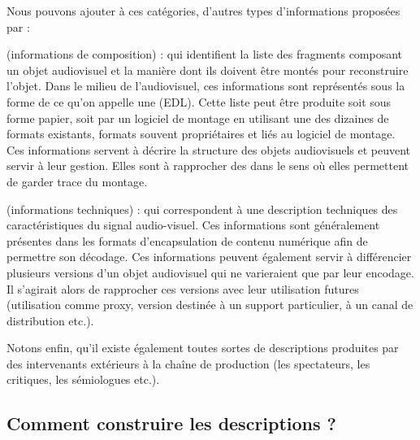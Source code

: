 Nous pouvons ajouter à ces catégories, d'autres types d'informations proposées par \cite{Rayers2002} : 
\begin{liste} 
	\item {} (informations de composition) : qui identifient la liste des fragments composant un objet audiovisuel et la manière dont ils doivent être montés pour reconstruire l'objet. 
	Dans le milieu de l'audiovisuel, ces informations sont représentés sous la forme de ce qu'on appelle une  (EDL).
	Cette liste peut être produite soit sous forme papier, soit par un logiciel de montage en utilisant une des dizaines de formats existants, formats souvent propriétaires et liés au logiciel de montage. 
	Ces informations servent à décrire la structure des objets audiovisuels et peuvent servir à leur gestion.
	Elles sont à rapprocher des  dans le sens où elles permettent de garder trace du montage. 


	\item {} (informations techniques) : qui correspondent à une description techniques des caractéristiques du signal audio-visuel. 
	Ces informations sont généralement présentes dans les formats d'encapsulation de contenu numérique afin de permettre son décodage.
	Ces informations peuvent également servir à différencier plusieurs versions d'un objet audiovisuel qui ne varieraient que par leur encodage. 
	Il s'agirait alors de rapprocher ces versions avec leur utilisation futures (utilisation comme proxy, version destinée à un support particulier, à un canal de distribution etc.).
\end{liste}


Notons enfin, qu'il existe également toutes sortes de descriptions produites par des intervenants extérieurs à la chaîne de production (les spectateurs, les critiques, les sémiologues etc.).



\subsection{Comment construire les descriptions ?} 
